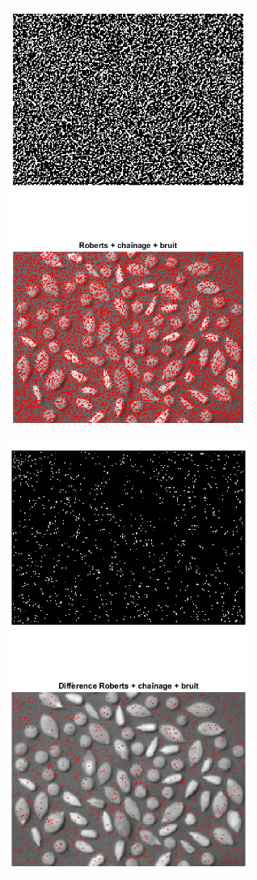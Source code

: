 \documentclass{article}
\begin{document}
\begin{itemize}[leftmargin=*]
\begin{itemize}[leftmargin=*]
\begin{minipage}[c]{0.46\linewidth}		
	\includegraphics[width=8cm]{Roberts_link_noise10.png}
\end{minipage}\hfill
\begin{minipage}[c]{0.46\linewidth}
	\includegraphics[width=8cm]{Diff_Roberts_link_noise10.png}
\end{minipage}\hfill


\end{itemize}
\end{itemize}
\end{document}
